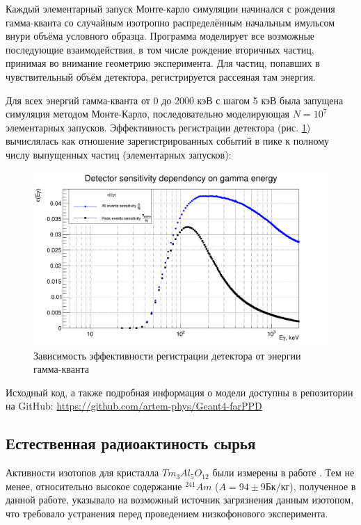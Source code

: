 \documentclass[a4paper,article,14pt]{extarticle}
\begin{document}
Каждый элементарный запуск Монте-карло симуляции начинался с рождения гамма-кванта со случайным изотропно распределённым начальным имульсом внури объёма условного образца. Программа моделирует все возможные последующие взаимодействия, в том числе рождение вторичных частиц, принимая во внимание геометрию эксперимента. Для частиц, попавших в чувствительный объём детектора, регистрируется рассеяная там энергия.

Для всех энергий гамма-кванта от 0 до 2000 кэВ с шагом 5 кэВ была запущена симуляция методом Монте-Карло, последовательно моделирующая $N = 10^7$ элементарных запусков. Эффективность регистрации детектора (рис. \ref{Ey}) вычислялась как отношение зарегистрированных событий в пике к полному числу выпущенных частиц (элементарных запусков):

\begin{figure}[h]
    \centering
    \includegraphics[width = 0.85 \textwidth]{images/DetSens.png}
    \caption{Зависимость эффективности регистрации детектора от энергии гамма-кванта}
    \label{Ey}
\end{figure}

Исходный код, а также подробная информация о модели доступны в репозитории на GitHub: \hyperlink{https://github.com/artem-phys/Geant4-farPPD}{https://github.com/artem-phys/Geant4-farPPD}


\subsection{Естественная радиоактиность сырья}

Активности изотопов для кристалла $Tm_3Al_5O_12$ были измерены в работе \cite{test_bolometric_tm}. Тем не менее, относительно высокое содержание $^{241}Am$ ($A = 94 \pm 9 \text{Бк} / \text{кг}$), полученное в данной работе, указывало на возможный источник загрязнения данным изотопом, что требовало устранения перед проведением низкофонового эксперимента.
\end{document}
